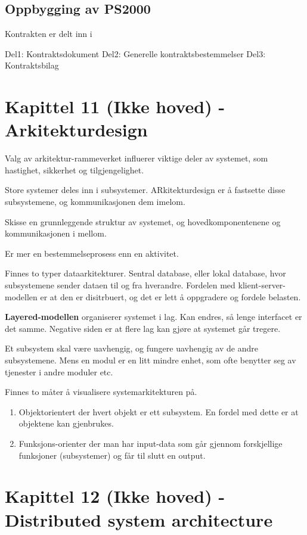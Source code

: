 \documentclass[11pt]{article}
\begin{document}
\subsection{Oppbygging av PS2000}
\label{sec-11.4}

   Kontrakten er delt inn i

   Del1: Kontraktsdokument 
   Del2: Generelle kontraktsbestemmelser 
   Del3: Kontraktsbilag
\section{Kapittel 11 (Ikke hoved) - Arkitekturdesign}
\label{sec-12}

  Valg av arkitektur-rammeverket influerer viktige deler av systemet, som hastighet, sikkerhet og tilgjengelighet. 

  Store systemer deles inn i subsystemer. ARkitekturdesign er å fastsette disse subsystemene, og kommunikasjonen dem imelom.
  
  Skisse en grunnleggende struktur av systemet, og hovedkomponentenene og kommunikasjonen i mellom.

  Er mer en bestemmelseprosess enn en aktivitet. 

  Finnes to typer dataarkitekturer. Sentral database, eller lokal database, hvor subsystemene sender dataen til og fra hverandre. Fordelen med klient-server-modellen er at den er disitrbuert, og det er lett å oppgradere og fordele belasten.

  \textbf{Layered-modellen} organiserer systemet i lag. Kan endres, så lenge interfacet er det samme. Negative siden er at flere lag kan gjøre at systemet går tregere.

  Et subsystem skal være uavhengig, og fungere uavhengig av de andre subsystemene. Mens en modul er en litt mindre enhet, som ofte benytter seg av tjenester i andre moduler etc.

  Finnes to måter å visualisere systemarkitekturen på.

\begin{enumerate}
\item Objektorientert
     der hvert objekt er ett subsystem. En fordel med dette er at objektene kan gjenbrukes.
\item Funksjons-orienter 
     der man har input-data som går gjennom forskjellige funksjoner (subsystemer) og får til slutt en output.
\end{enumerate}
\section{Kapittel 12 (Ikke hoved) - Distributed system architecture}
\label{sec-13}
\end{document}
